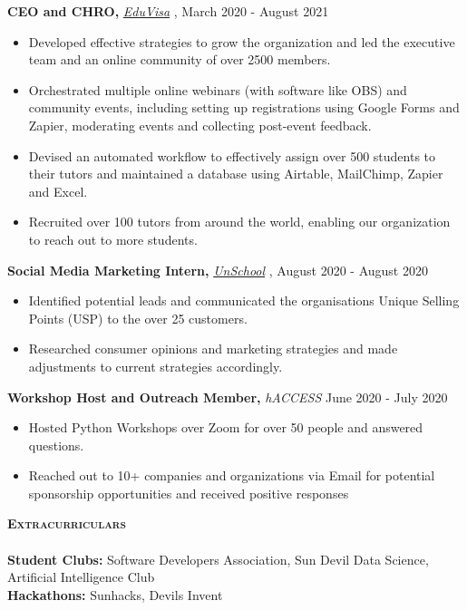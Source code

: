 \documentclass[a4paper]{article}
\newcommand{\lineunder} {
    \vspace*{-8pt} \\
    \hspace*{-18pt} \hrulefill \\
}
\newcommand{\header} [1] {
    {\hspace*{-15pt}\vspace*{3pt} \textsc{#1}}
    \vspace*{-6pt} \lineunder
}
\begin{document}
\textbf{CEO and CHRO, }\textit{{\href{https://myeduvisa.org/}{EduVisa}} \faExternalLink},   \hfill March 2020 - August 2021\\
\vspace{-3mm}
\begin{itemize} \itemsep 1pt
	\item Developed effective strategies to grow the organization and led the executive team and an online community of over 2500 members.
	\item Orchestrated multiple online webinars (with software like OBS) and community events, including setting up registrations using Google Forms and Zapier, moderating events and collecting post-event feedback.
	\item Devised an automated workflow to effectively assign over 500 students to their tutors and maintained a database using Airtable, MailChimp, Zapier and Excel.
	\item Recruited over 100 tutors from around the world, enabling our organization to reach out to more students.
\end{itemize}

\textbf{Social Media Marketing Intern, }\textit{{\href{https://www.unschool.in/}{UnSchool}} \faExternalLink},  \hfill August 2020 - August 2020\\
\vspace{-3mm}
\begin{itemize} \itemsep 1pt
	\item Identified potential leads and communicated the organisation\textquotesingle{}s Unique Selling Points (USP) to the over 25 customers.
	\item Researched consumer opinions and marketing strategies and made adjustments to current strategies accordingly.
\end{itemize}

\textbf{Workshop Host and Outreach Member, }\textit{hACCESS}  \hfill June 2020 - July 2020\\
\vspace{-3mm}
\begin{itemize} \itemsep 1pt
	\item Hosted Python Workshops over Zoom for over 50 people and answered questions.
	\item Reached out to 10+ companies and organizations via Email for potential sponsorship opportunities and received positive responses
\end{itemize}

\vspace{-2mm}


\header{\textbf{Extracurriculars}}


\textbf{Student Clubs:} Software Developers Association, Sun Devil Data Science, Artificial Intelligence Club \\
\textbf{Hackathons:} Sunhacks, Devils Invent



\vspace{-50mm}
    
\end{document}
